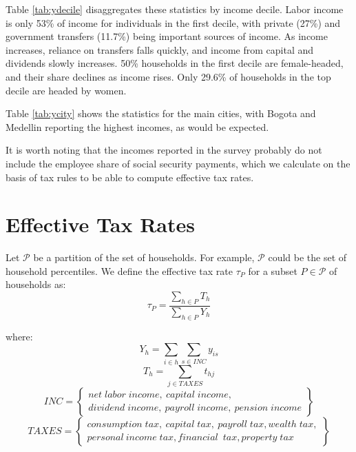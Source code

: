 \documentclass[12pt]{article}
\begin{document}
Table \ref{tab:ydecile} disaggregates these statistics by income decile.
Labor income is only 53\% of income for individuals in the first decile,
with private (27\%) and government transfers (11.7\%)
being important sources of income.
As income increases, reliance on transfers falls quickly,
and income from capital and dividends slowly increases.
50\% households in the first decile are female-headed,
and their share declines as income rises.
Only 29.6\% of households in the top decile are headed by women.

Table \ref{tab:ycity} shows the statistics for the main cities,
with Bogota and Medellin reporting the highest incomes, as would be expected.

It is worth noting that the incomes reported in the survey
probably do not include the employee share of social security payments,
which we calculate on the basis of tax rules
to be able to compute effective tax rates.

\section{Effective Tax Rates}

Let $\mathcal{P}$ be a partition of the set of households.
For example, $\mathcal{P}$ could be the set of household percentiles.
We define the effective tax rate $\tau_P$
for a subset $P\in\mathcal{P}$ of households as:
\begin{equation}
\tau_P = \frac{\sum_{h\in P}T_{h}} {\sum_{h\in P}Y_h}
\end{equation}
\iffalse [[JEFF: Verify: is that even what we do?
    I (Jeff) thought we compute an average of ratios,
    not a ratio of averages.]]
\fi
where:
\begin{equation}
Y_h = \sum_{i\in h}\sum_{s\in INC}y_{is}
\end{equation}
\begin{equation}
T_h = \sum_{j\in TAXES}t_{hj}
\end{equation}
\begin{equation}
  INC = \left\{ \begin{array}{cc}
    net \; labor \;income,\ capital \;income,\  \\
    dividend \;income,\ payroll \;income,\ pension \;income
  \end{array} \right\}
\end{equation}
\begin{equation}
  TAXES = \left\{ \begin{array}{cc}
    consumption \;tax,\ capital \;tax,\  payroll \;tax, wealth \;tax, \\
    personal\ income \;tax, financial\ \;tax, property \;tax
  \end{array} \right\}
\end{equation}
\end{document}
